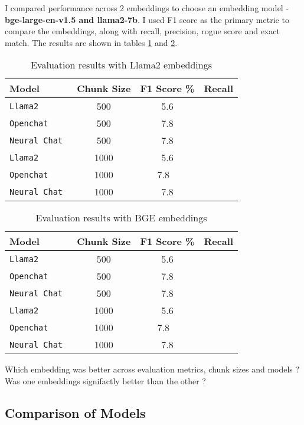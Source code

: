 \documentclass[11pt]{article}
\begin{document}
I compared performance across 2 embeddings to choose an embedding model - \textbf{bge-large-en-v1.5 and llama2-7b}. I used F1 score as the primary metric to compare the embeddings, along with recall, precision, rogue score and exact match. The results are shown in tables \ref{tab:accents} and \ref{tab:accents2}.
\begin{table}
\centering
  \begin{tabular}{ l c c r }
  \hline
    \textbf{Model} & \textbf{Chunk Size} & \textbf{F1 Score \%} & \textbf{Recall}\\
    \hline
    \verb|Llama2 | & 500 &  {5.6} & {} \\
    \verb|Openchat | & 500 & {7.8}  & {}\\ 
    \verb|Neural Chat | & 500 &{7.8}  & {}\\ 
    \verb|Llama2 | & 1000 &  {5.6}  & {}\\
    \verb|Openchat | & 1000 & {7.8} \ & {} \\ 
    \verb|Neural Chat | & 1000 &{7.8}  & {}\\ 
    \hline
  \end{tabular}
\caption{Evaluation results with Llama2 embeddings}
\label{tab:accents}
\end{table}

\begin{table}
  \centering
    \begin{tabular}{ l c c r }
    \hline
      \textbf{Model} & \textbf{Chunk Size} & \textbf{F1 Score \%} & \textbf{Recall}\\
      \hline
      \verb|Llama2 | & 500 &  {5.6} & {} \\
      \verb|Openchat | & 500 & {7.8}  & {}\\ 
      \verb|Neural Chat | & 500 &{7.8}  & {}\\ 
      \verb|Llama2 | & 1000 &  {5.6}  & {}\\
      \verb|Openchat | & 1000 & {7.8} \ & {} \\ 
      \verb|Neural Chat | & 1000 &{7.8}  & {}\\ 
      \hline
    \end{tabular}
  \caption{Evaluation results with BGE embeddings}
  \label{tab:accents2}
  \end{table}

  Which embedding was better across evaluation metrics, chunk sizes and models ?
  Was one embeddings signifactly better than the other ?

\subsection{Comparison of Models}
\end{document}

